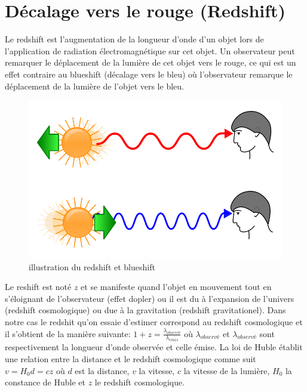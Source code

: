 \section*{Décalage vers le rouge (Redshift)}
Le redshift est l'augmentation de la longueur d'onde d'un objet lors de l'application de radiation électromagnétique sur cet objet. Un observateur peut remarquer le déplacement de la lumière de cet objet vers le rouge, ce qui est un effet contraire au blueshift (décalage vers le bleu) où l'observateur remarque le déplacement de la lumière de l'objet vers le bleu.
\begin{figure}[H]
	\includegraphics[scale=0.3]{images/reshift.png}
	\caption{illustration du redshift et blueshift}
	\label{redblue}
\end{figure}
Le reshift est noté $z$ et se manifeste quand l'objet en mouvement tout en s'éloignant de l'observateur (effet dopler) ou il est du à l'expansion de l'univers (redshift cosmologique) ou due à la gravitation (redshift gravitationel). Dans notre cas le redshit qu'on essaie d'estimer correspond au redshift cosmologique et il s'obtient de la manière suivante: $1 + z = \frac{\lambda_{observé}}{\lambda_{emis}}$ où $\lambda_{observé}$ et $\lambda_{observé}$ sont respectivement la longueur d'onde observée et celle émise. La loi de Huble établit une relation entre la distance et le redshift cosmologique comme suit $v = H_0d = cz$ où $d$ est la distance, $v$ la vitesse, $c$ la vitesse de la lumière, $H_0$ la constance de Huble et $z$ le redshift cosmologique.
